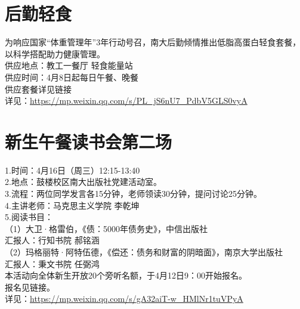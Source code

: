 \documentclass[letterpaper, 12pt]{article}
\begin{document}
\begin{multicols}{2}
\section{后勤轻食}
为响应国家“体重管理年”3年行动号召，南大后勤倾情推出低脂高蛋白轻食套餐，以科学搭配助力健康管理。
\\供应地点：教工一餐厅 轻食能量站
\\供应时间：4月8日起每日午餐、晚餐
\\供应套餐详见链接
\\详见：\url{https://mp.weixin.qq.com/s/PL_jS6nU7_PdbV5GLS0vyA}

\section{新生午餐读书会第二场}
1.时间：4月16日（周三）12:15-13:40
\\2.地点：鼓楼校区南大出版社党建活动室。
\\3.流程：两位同学发言各15分钟，老师领读30分钟，提问讨论25分钟。
\\4.主讲老师：马克思主义学院 李乾坤
\\5.阅读书目：
\\（1）大卫·格雷伯，《债：5000年债务史》，中信出版社
\\汇报人：行知书院 郝铭涵
\\（2）玛格丽特·阿特伍德，《偿还：债务和财富的阴暗面》，南京大学出版社
\\汇报人：秉文书院 任弼鸿
\\本活动向全体新生开放20个旁听名额，于4月12日9：00开始报名。
\\报名见链接。
\\详见：\url{https://mp.weixin.qq.com/s/gA32aiT-w_HMlNr1tuVPyA}


\end{multicols}
\end{document}
